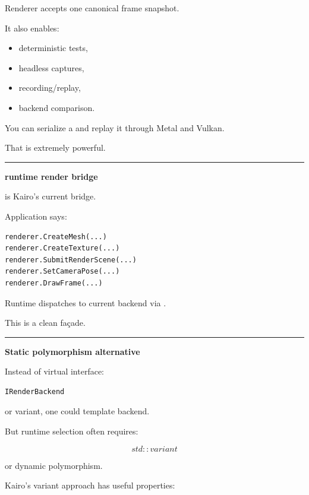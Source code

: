 Renderer accepts one canonical frame snapshot.

It also enables:

\begin{itemize}
\tightlist
\item
  deterministic tests,
\item
  headless captures,
\item
  recording/replay,
\item
  backend comparison.
\end{itemize}

You can serialize a  and replay it through Metal and Vulkan.

That is extremely powerful.

\begin{center}\rule{0.5\linewidth}{0.5pt}\end{center}

\textbf{runtime render bridge}

 is Kairo's current bridge.

Application says:

\begin{verbatim}
renderer.CreateMesh(...)
renderer.CreateTexture(...)
renderer.SubmitRenderScene(...)
renderer.SetCameraPose(...)
renderer.DrawFrame(...)
\end{verbatim}

Runtime dispatches to current backend via .

This is a clean façade.

\begin{center}\rule{0.5\linewidth}{0.5pt}\end{center}

\textbf{Static polymorphism alternative}

Instead of virtual interface:

\begin{verbatim}
IRenderBackend
\end{verbatim}

or variant, one could template backend.

But runtime selection often requires:

\[
std::variant
\]

or dynamic polymorphism.

Kairo's variant approach has useful properties:

